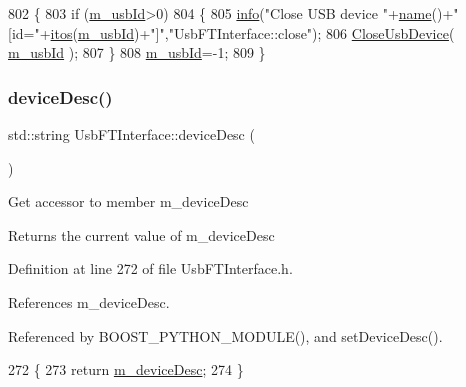 \begin{DoxyCode}
802                              \{
803   \textcolor{keywordflow}{if} (\hyperlink{classUsbFTInterface_a91df5c0547e8be460bc087e27afe05aa}{m\_usbId}>0)
804   \{    
805     \hyperlink{classObject_a644fd329ea4cb85f54fa6846484b84a8}{info}(\textcolor{stringliteral}{"Close USB device "}+\hyperlink{classObject_a300f4c05dd468c7bb8b3c968868443c1}{name}()+\textcolor{stringliteral}{" [id="}+\hyperlink{Tools_8h_af330027dbdafb9a30768b3613c553e60}{itos}(\hyperlink{classUsbFTInterface_a91df5c0547e8be460bc087e27afe05aa}{m\_usbId})+\textcolor{stringliteral}{"]"},\textcolor{stringliteral}{"UsbFTInterface::close"});
806     \hyperlink{LALUsbML_8h_a3f0a3f9e09951c39ae1df0638008875a}{CloseUsbDevice}( \hyperlink{classUsbFTInterface_a91df5c0547e8be460bc087e27afe05aa}{m\_usbId} );
807   \}
808   \hyperlink{classUsbFTInterface_a91df5c0547e8be460bc087e27afe05aa}{m\_usbId}=-1;
809 \}
\end{DoxyCode}
\mbox{\label{classUsbFTInterface_af353796fd68a869ea5c8e753aa65dc2c}} 
\subsubsection{\texorpdfstring{device\+Desc()}{deviceDesc()}}
{\footnotesize\ttfamily std\+::string Usb\+F\+T\+Interface\+::device\+Desc (\begin{DoxyParamCaption}{ }\end{DoxyParamCaption})\hspace{0.3cm}{\ttfamily [inline]}}

Get accessor to member m\+\_\+device\+Desc \begin{DoxyReturn}{Returns}
the current value of m\+\_\+device\+Desc 
\end{DoxyReturn}


Definition at line 272 of file Usb\+F\+T\+Interface.\+h.



References m\+\_\+device\+Desc.



Referenced by B\+O\+O\+S\+T\+\_\+\+P\+Y\+T\+H\+O\+N\+\_\+\+M\+O\+D\+U\+L\+E(), and set\+Device\+Desc().


\begin{DoxyCode}
272                           \{
273     \textcolor{keywordflow}{return} \hyperlink{classUsbFTInterface_a500067688c32cdb3719fecf128e88dca}{m\_deviceDesc};
274   \}
\end{DoxyCode}
\mbox{\label{classUsbFTInterface_abb29c7f73506259ef57d1e25204f8f7c}} 
